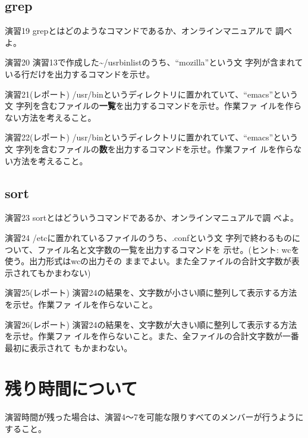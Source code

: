 \documentclass[a4j,10pt]{jarticle}
\begin{document}
\subsection{grep}
\begin{itembox}{演習19}
 {\sffamily grep}とはどのようなコマンドであるか、オンラインマニュアルで
 調べよ。
\end{itembox}
\begin{itembox}{演習20}
 演習13で作成した{\sffamily \~{}/usrbinlist}のうち、``mozilla''という文
 字列が含まれている行だけを出力するコマンドを示せ。
\end{itembox}
\begin{itembox}{演習21(レポート)}
 {\sffamily /usr/bin}というディレクトリに置かれていて、``emacs''という文
 字列を含むファイルの{\bfseries 一覧}を出力するコマンドを示せ。作業ファ
 イルを作らない方法を考えること。
\end{itembox}
\begin{itembox}{演習22(レポート)}
 {\sffamily /usr/bin}というディレクトリに置かれていて、``emacs''という文
 字列を含むファイルの{\bfseries 数}を出力するコマンドを示せ。作業ファイ
 ルを作らない方法を考えること。
\end{itembox}
\subsection{sort}
\begin{itembox}{演習23}
 {\sffamily sort}とはどういうコマンドであるか、オンラインマニュアルで調
 べよ。
\end{itembox}
\begin{itembox}{演習24}
 {\sffamily /etc}に置かれているファイルのうち、{\sffamily .conf}という文
 字列で終わるものについて、ファイル名と文字数の一覧を出力するコマンドを
 示せ。(ヒント: {\sffamily wc}を使う。出力形式は{\sffamily wc}の出力その
 ままでよい。また全ファイルの合計文字数が表示されてもかまわない)
\end{itembox}
\begin{itembox}{演習25(レポート)}
 演習24の結果を、文字数が小さい順に整列して表示する方法を示せ。作業ファ
 イルを作らないこと。
\end{itembox}
\begin{itembox}{演習26(レポート)}
 演習24の結果を、文字数が大きい順に整列して表示する方法を示せ。作業ファ
 イルを作らないこと。また、全ファイルの合計文字数が一番最初に表示されて
 もかまわない。
\end{itembox}
\section{残り時間について}
演習時間が残った場合は、演習4〜7を可能な限りすべてのメンバーが行うように
すること。
\end{document}
